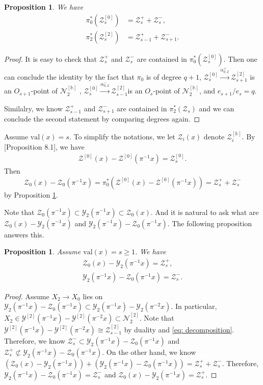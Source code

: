 \documentclass[11pt,oneside]{amsart}
\newcommand{\val}{{\mathrm{val}}}
\theoremstyle{plain}
\newtheorem{proposition}[theorem]{Proposition}
\theoremstyle{definition}
\theoremstyle{remark}
\newcommand{\cZ}{\mathcal{Z}}
\newcommand{\cY}{\mathcal{Y}}
\newcommand{\cN}{\mathcal{N}}
\numberwithin{equation}{section}
\begin{document}
	\begin{proposition}\label{prop: pullback along pi_0}
		We have
		\begin{align*}
			\pi_0^*(\cZ_{s}^{[0]})&=\cZ_{s}^{+}+\cZ_{s}^{-},\\
			\pi_2^*(\cZ_{s}^{[2]})&=\cZ_{s-1}^{+}+\cZ_{s+1}^{-}.
		\end{align*}
	\end{proposition}
	\begin{proof}
		It is easy to check that $\cZ_{s}^{+}$ and $\cZ_{s}^{-}$ are contained in $\pi_0^*(\cZ_{s}^{[0]})$. Then one can conclude the identity by the fact that $\pi_0$ is of degree $q+1$, $\cZ_{s}^{[0]}\stackrel{\alpha_{0,2}^+}{\to} \cZ_{s+1}^{[2]}$ is  an $O_{s+1}$-point of $\cN_2^{[\mathds{h}]}$ , $\cZ_{s}^{[0]}\stackrel{\alpha_{0,2}^-}{\to}  \cZ_{s-1}^{[2]}$is an $O_{s}$-point of $\cN_2^{[\mathds{h}]}$, and $e_{s+1}/e_s=q$. 
		
		Similalry, we know $\cZ_{s-1}^{+}$ and  $\cZ_{s+1}^{-}$ are contained in $	\pi_2^*(\cZ_{s})$ and we can conclude the second statement by comparing degrees again.
	\end{proof}
Assume $\val(x)=s$. To simplify the notations, we let $\cZ_i(x)$ denote $\cZ_i^{[\mathds{h}]}$. By \cite{KR1}[Proposition 8.1],  we have 
\begin{align}\label{eq: decomposition}
\cZ^{[0]}(x)-\cZ^{[0]}(\pi^{-1}x)=\cZ_s^{[0]}.
\end{align} 
Then $$\cZ_0(x)-\cZ_0(\pi^{-1}x)=\pi_0^*(\cZ^{[0]}(x)-\cZ^{[0]}(\pi^{-1}x))=\cZ_{s}^{+}+\cZ_{s}^{-}$$
by Proposition \ref{prop: pullback along pi_0}.

Note that  $\cZ_0(\pi^{-1}x)\subset \cY_2(\pi^{-1}x) \subset \cZ_0(x)$. And it is natural to ask what  are $   \cZ_0(x) -\cY_2(\pi^{-1}x)$ and 
$\cY_2(\pi^{-1}x)-\cZ_0(\pi^{-1}x)$. The following proposition answers this.
\begin{proposition}\label{prop: diff div as quasicanonical lifting}
	Assume $\val(x)=s\ge 1$. We have 
	\begin{align*}
	 \cZ_0(x) -\cY_2(\pi^{-1}x)=\cZ_s^+ ,\\
	 \cY_2(\pi^{-1}x)-\cZ_0(\pi^{-1}x)=\cZ_s^-.
	\end{align*}
\end{proposition}
\begin{proof}
Assume $X_2\to X_0$ lies on $\cY_2(\pi^{-1}x)-\cZ_0(\pi^{-1}x)\subset \cY_2(\pi^{-1}x)-\cY_2(\pi^{-2}x) $. In particular, $X_2 \in \cY^{[2]}(\pi^{-1}x)-\cY^{[2]}(\pi^{-2}x) \subset \cN_2^{[2]}$. Note that $\cY^{[2]}(\pi^{-1}x)-\cY^{[2]}(\pi^{-2}x)\cong  \cZ_{s-1}^{[2]}$ by duality and \eqref{eq: decomposition}. Therefore, we know $\cZ_s^{-}\subset \cY_2(\pi^{-1}x) -\cZ_0(\pi^{-1}x) $ and $\cZ_s^{+}\not \subset \cY_2(\pi^{-1}x) -\cZ_0(\pi^{-1}x) $. On the other hand, we know $( \cZ_0(x) -\cY_2(\pi^{-1}x))+
(\cY_2(\pi^{-1}x)-\cZ_0(\pi^{-1}x))=\cZ_s^+ +\cZ_s^-.$ Therefore, $ \cY_2(\pi^{-1}x)-\cZ_0(\pi^{-1}x)=\cZ_s^-$ and $ \cZ_0(x) -\cY_2(\pi^{-1}x)=\cZ_s^+ $.
\end{proof}
\end{document}
